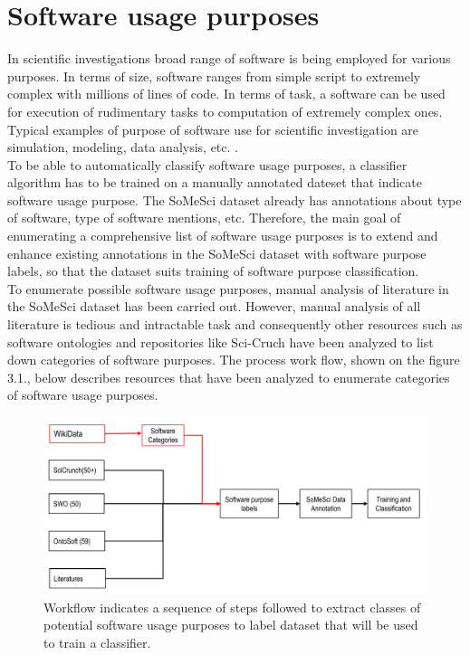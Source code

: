 \chapter{Software usage purposes}
\label{ch:purpose}

%
%
In scientific investigations broad range of software is being employed for various purposes. In terms of size, software ranges from simple script to extremely complex with millions of lines of code. In terms of task, a software can be used for execution of rudimentary tasks to computation of extremely complex ones. Typical examples of purpose of software use for scientific investigation are simulation, modeling, data analysis, etc. \citep{goble2014better}. \\


To be able to automatically classify software usage purposes, a classifier algorithm has to be trained on a manually annotated dateset that indicate software usage purpose. The \ac{SoMeSci} dataset already has annotations about type of software, type of software mentions, etc. Therefore, the main goal of enumerating a comprehensive list of software usage purposes is to extend and enhance existing annotations in the SoMeSci dataset with software purpose labels, so that the dataset suits training of software purpose classification. \\


To enumerate possible software usage purposes, manual analysis of literature in the SoMeSci dataset has been carried out. However, manual analysis of all literature is tedious and intractable task and consequently other resources such as software ontologies and repositories like Sci-Cruch have been analyzed to list down categories of software purposes. The process work flow, shown on the figure 3.1., below describes resources that have been analyzed to enumerate categories of software usage purposes.

\begin{figure}[htbp]
	\centering
	\includegraphics[width=.80\textwidth]{4.graphics/figures/ch_3/softwarePurposeprocess}
	\caption{Workflow indicates a sequence of steps followed to extract classes of potential software usage purposes to label dataset that will be used to train a classifier.}
	\label{fig:chapter03:setup}
\end{figure}


